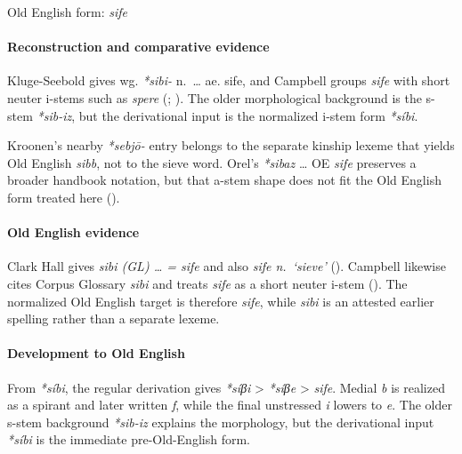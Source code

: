 \documentclass[
  british,
  a4paper,
]{article}
\begin{document}
Old English form: \emph{sife}

\paragraph{Reconstruction and comparative
evidence}\label{reconstruction-and-comparative-evidence-25}

Kluge-Seebold gives wg. \emph{*sibi-} n.~\ldots{} ae. sife, and Campbell
groups \emph{sife} with short neuter i-stems such as \emph{spere}
(;
). The older
morphological background is the s-stem \emph{*sib-iz}, but the
derivational input is the normalized i-stem form \emph{*síbi}.

Kroonen's nearby \emph{*sebjō-} entry belongs to the separate kinship
lexeme that yields Old English \emph{sibb}, not to the sieve word.
Orel's \emph{*sibaz} \ldots{} OE \emph{sife} preserves a broader
handbook notation, but that a-stem shape does not fit the Old English
form treated here ().

\paragraph{Old English evidence}\label{old-english-evidence-25}

Clark Hall gives \emph{sibi (GL) \ldots{} = sife} and also \emph{sife
n.~`sieve'} ().
Campbell likewise cites Corpus Glossary \emph{sibi} and treats
\emph{sife} as a short neuter i-stem
(). The
normalized Old English target is therefore \emph{sife}, while
\emph{sibi} is an attested earlier spelling rather than a separate
lexeme.

\paragraph{Development to Old
English}\label{development-to-old-english-25}

From \emph{*síbi}, the regular derivation gives \emph{*síβi}
\textgreater{} \emph{*síβe} \textgreater{} \emph{sife}. Medial \emph{b}
is realized as a spirant and later written \emph{f}, while the final
unstressed \emph{i} lowers to \emph{e}. The older s-stem background
\emph{*sib-iz} explains the morphology, but the derivational input
\emph{*síbi} is the immediate pre-Old-English form.
\end{document}
